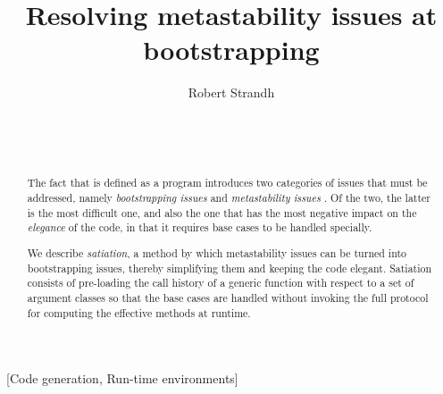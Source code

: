 \documentclass{acm_proc_article-sp}
\def\inputtex#1{}
\begin{document}
\title{Resolving metastability issues at bootstrapping}
\author{\alignauthor
Robert Strandh\\
\\
\\
\\
}

\maketitle

\begin{abstract}
The fact that \clos{} is defined as a \clos{} program introduces two
categories of issues that must be addressed, namely
\emph{bootstrapping issues} and \emph{metastability issues}
\cite{Kiczales:1991:AMP:574212}.  Of the two, the latter is the most
difficult one, and also the one that has the most negative impact on
the \emph{elegance} of the code, in that it requires base cases to be
handled specially.

We describe \emph{satiation}, a method by which metastability issues
can be turned into bootstrapping issues, thereby simplifying them and
keeping the code elegant.  Satiation consists of pre-loading the call
history of a generic function with respect to a set of argument
classes so that the base cases are handled without invoking the full
protocol for computing the effective methods at runtime. 
\end{abstract}

[Code generation, Run-time environments]

\inputtex{sec-introduction.tex}
\inputtex{sec-previous.tex}
\inputtex{sec-our-method.tex}
\inputtex{sec-conclusions.tex}



\end{document}
